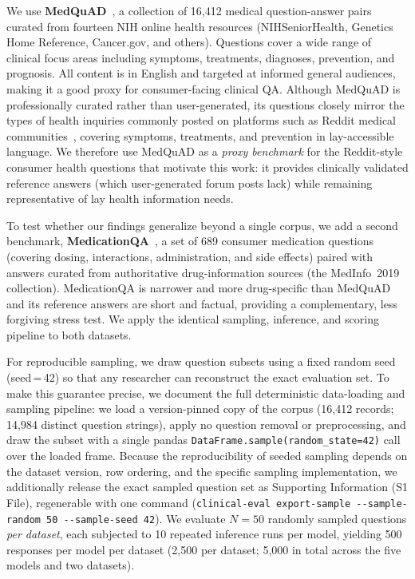 \documentclass[10pt,letterpaper]{article}
\begin{document}
We use \textbf{MedQuAD}~\cite{abacha2019mqa}, a collection of
16,412 medical question-answer pairs curated from fourteen NIH online
health resources (NIHSeniorHealth, Genetics Home Reference, Cancer.gov,
and others).
Questions cover a wide range of clinical focus areas including symptoms,
treatments, diagnoses, prevention, and prognosis.
All content is in English and targeted at informed general audiences,
making it a good proxy for consumer-facing clinical QA.
Although MedQuAD is professionally curated rather than user-generated,
its questions closely mirror the types of health inquiries commonly
posted on platforms such as Reddit medical
communities~\cite{sager2021reddit}, covering symptoms, treatments,
and prevention in lay-accessible language. We therefore use MedQuAD as
a \emph{proxy benchmark} for the Reddit-style consumer health questions
that motivate this work: it provides clinically validated reference
answers (which user-generated forum posts lack) while remaining
representative of lay health information needs.

To test whether our findings generalize beyond a single corpus, we add
a second benchmark, \textbf{MedicationQA}~\cite{abacha2019medication}, a
set of 689 consumer medication questions (covering dosing, interactions,
administration, and side effects) paired with answers curated from
authoritative drug-information sources (the MedInfo~2019 collection).
MedicationQA is narrower and more drug-specific than MedQuAD and its
reference answers are short and factual, providing a complementary, less
forgiving stress test. We apply the identical sampling, inference, and
scoring pipeline to both datasets.

For reproducible sampling, we draw question subsets using a fixed
random seed (seed\,=\,42) so that any researcher can reconstruct the
exact evaluation set. To make this guarantee precise, we document the
full deterministic data-loading and sampling pipeline: we load a
version-pinned copy of the corpus (16{,}412 records; 14{,}984 distinct
question strings), apply no question removal or preprocessing, and draw
the subset with a single pandas \texttt{DataFrame.sample(random\_state=42)}
call over the loaded frame. Because the reproducibility of seeded
sampling depends on the dataset version, row ordering, and the specific
sampling implementation, we additionally release the exact sampled
question set as Supporting Information (S1 File), regenerable with one
command (\texttt{clinical-eval export-sample -{}-sample-random 50 -{}-sample-seed 42}).
We evaluate $N{=}50$ randomly sampled questions \emph{per dataset}, each
subjected to 10 repeated inference runs per model, yielding 500
responses per model per dataset (2{,}500 per dataset; 5{,}000 in total
across the five models and two datasets).
\end{document}
